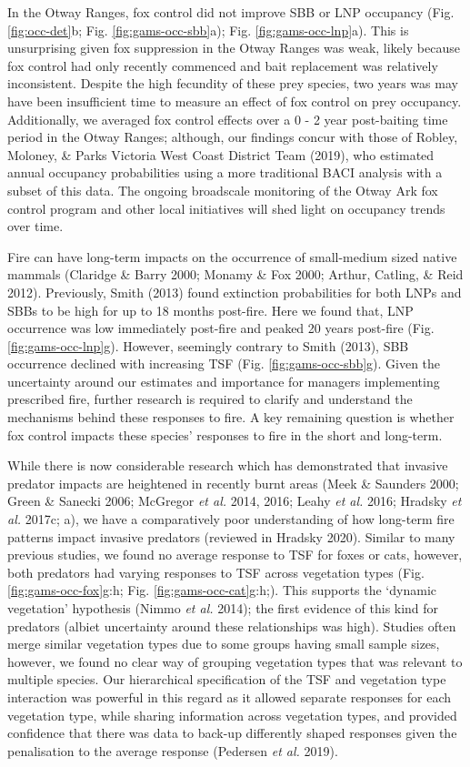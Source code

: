 \documentclass[11pt,a4paper,titlepage,twoside,openright]{style/unimelbthesis}
\begin{document}
\begin{mainmatter}
In the Otway Ranges, fox control did not improve SBB or LNP occupancy (Fig. \ref{fig:occ-det}b; Fig. \ref{fig:gams-occ-sbb}a); Fig. \ref{fig:gams-occ-lnp}a). This is unsurprising given fox suppression in the Otway Ranges was weak, likely because fox control had only recently commenced and bait replacement was relatively inconsistent. Despite the high fecundity of these prey species, two years was may have been insufficient time to measure an effect of fox control on prey occupancy. Additionally, we averaged fox control effects over a 0 - 2 year post-baiting time period in the Otway Ranges; although, our findings concur with those of Robley, Moloney, \& Parks Victoria West Coast District Team (2019), who estimated annual occupancy probabilities using a more traditional BACI analysis with a subset of this data. The ongoing broadscale monitoring of the Otway Ark fox control program and other local initiatives will shed light on occupancy trends over time.

Fire can have long-term impacts on the occurrence of small-medium sized native mammals (Claridge \& Barry 2000; Monamy \& Fox 2000; Arthur, Catling, \& Reid 2012). Previously, Smith (2013) found extinction probabilities for both LNPs and SBBs to be high for up to 18 months post-fire. Here we found that, LNP occurrence was low immediately post-fire and peaked 20 years post-fire (Fig. \ref{fig:gams-occ-lnp}g). However, seemingly contrary to Smith (2013), SBB occurrence declined with increasing TSF (Fig. \ref{fig:gams-occ-sbb}g). Given the uncertainty around our estimates and importance for managers implementing prescribed fire, further research is required to clarify and understand the mechanisms behind these responses to fire. A key remaining question is whether fox control impacts these species' responses to fire in the short and long-term.

While there is now considerable research which has demonstrated that invasive predator impacts are heightened in recently burnt areas (Meek \& Saunders 2000; Green \& Sanecki 2006; McGregor \emph{et al.} 2014, 2016; Leahy \emph{et al.} 2016; Hradsky \emph{et al.} 2017c; a), we have a comparatively poor understanding of how long-term fire patterns impact invasive predators (reviewed in Hradsky 2020). Similar to many previous studies, we found no average response to TSF for foxes or cats, however, both predators had varying responses to TSF across vegetation types (Fig. \ref{fig:gams-occ-fox}g:h; Fig. \ref{fig:gams-occ-cat}g:h;). This supports the `dynamic vegetation' hypothesis (Nimmo \emph{et al.} 2014); the first evidence of this kind for predators (albiet uncertainty around these relationships was high). Studies often merge similar vegetation types due to some groups having small sample sizes, however, we found no clear way of grouping vegetation types that was relevant to multiple species. Our hierarchical specification of the TSF and vegetation type interaction was powerful in this regard as it allowed separate responses for each vegetation type, while sharing information across vegetation types, and provided confidence that there was data to back-up differently shaped responses given the penalisation to the average response (Pedersen \emph{et al.} 2019).


\end{mainmatter}
\end{document}
